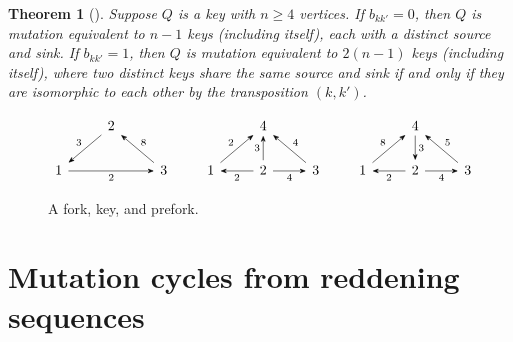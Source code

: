 \documentclass[11pt, letterpaper]{amsart}
\newtheorem{theorem}{Theorem}[section]
\theoremstyle{definition}
\numberwithin{equation}{section}
\begin{document}
\begin{theorem}[{\cite[Corollary~5.3, c.f.\ Figure~18]{MR4695532}}]
\label{thm:finiteKeys}
Suppose $Q$ is a key with $n \geq 4$ vertices. 
If $b_{kk'} = 0$, then $Q$ is mutation equivalent to $n-1$ keys (including itself), each with a distinct source and sink.
If $b_{kk'} = 1$, then $Q$ is mutation equivalent to $2(n-1)$ keys (including itself), where two distinct keys share the same source and sink if and only if they are isomorphic to each other by the transposition $(k,k')$. %
\end{theorem}

\begin{figure}[ht]
    \centering
    \vspace{-10pt} %
    
        \[\begin{tikzcd}[every arrow/.append style = {-{Stealth}}]
             & 2 & \\
            1 &  & 3 
            \arrow[from=1-2,to=2-1,"3"']
            \arrow[from=2-3,to=1-2,"8"']
            \arrow[from=2-1,to=2-3,"2"']
        \end{tikzcd} \quad \quad
        \begin{tikzcd}[every arrow/.append style = {-{Stealth}}]
            & 4 & \\
            1 & 2 & 3 
            \arrow[from=2-2,to=2-1,"2"]
            \arrow[from=2-2,to=2-3,"4"']
            \arrow[from=2-1,to=1-2,"2"]
            \arrow[from=2-2,to=1-2,"3"]
            \arrow[from=2-3,to=1-2,"4"']
        \end{tikzcd} \quad \quad
        \begin{tikzcd}[every arrow/.append style = {-{Stealth}}]
            & 4 & \\
            1 & 2 & 3 
            \arrow[from=2-2,to=2-1,"2"]
            \arrow[from=2-2,to=2-3,"4"']
            \arrow[from=2-1,to=1-2,"8"]
            \arrow[from=1-2,to=2-2,"3"]
            \arrow[from=2-3,to=1-2,"5"']
        \end{tikzcd} 
        \]
    \caption{A fork, key, and prefork.}
    \label{fig:quiver types}
\end{figure}



\newpage
\section{Mutation cycles from reddening sequences}
\label{sec:red makes cycles}
\end{document}
